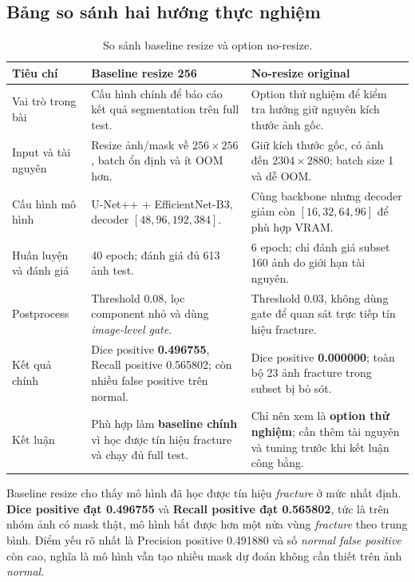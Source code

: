 \documentclass[12pt,a4paper]{article}
\newcommand{\thead}[1]{\cellcolor{tablehead}\textbf{#1}}
\newcommand{\important}[1]{\textbf{#1}}
\begin{document}
\subsection*{Bảng so sánh hai hướng thực nghiệm}
\begin{table}[H]
\centering
\caption{So sánh baseline resize và option no-resize.}
\label{tab:resize_noresize_compare}
\footnotesize
\setlength{\tabcolsep}{3pt}
\begin{tabularx}{\textwidth}{|p{2.7cm}|Y|Y|}
\hline
\thead{Tiêu chí} & \thead{Baseline resize 256} & \thead{No-resize original} \\
\hline
Vai trò trong bài & Cấu hình chính để báo cáo kết quả segmentation trên full test. & Option thử nghiệm để kiểm tra hướng giữ nguyên kích thước ảnh gốc. \\
\hline
Input và tài nguyên & Resize ảnh/mask về \(256 \times 256\), batch ổn định và ít OOM hơn. & Giữ kích thước gốc, có ảnh đến \(2304 \times 2880\); batch size 1 và dễ OOM. \\
\hline
Cấu hình mô hình & U-Net++ + EfficientNet-B3, decoder \([48,96,192,384]\). & Cùng backbone nhưng decoder giảm còn \([16,32,64,96]\) để phù hợp VRAM. \\
\hline
Huấn luyện và đánh giá & 40 epoch; đánh giá đủ 613 ảnh test. & 6 epoch; chỉ đánh giá subset 160 ảnh do giới hạn tài nguyên. \\
\hline
Postprocess & Threshold 0.08, lọc component nhỏ và dùng \textit{image-level gate}. & Threshold 0.03, không dùng gate để quan sát trực tiếp tín hiệu fracture. \\
\hline
Kết quả chính & Dice positive \important{0.496755}, Recall positive 0.565802; còn nhiều false positive trên normal. & Dice positive \important{0.000000}; toàn bộ 23 ảnh fracture trong subset bị bỏ sót. \\
\hline
Kết luận & Phù hợp làm \important{baseline chính} vì học được tín hiệu fracture và chạy đủ full test. & Chỉ nên xem là \important{option thử nghiệm}; cần thêm tài nguyên và tuning trước khi kết luận công bằng. \\
\hline
\end{tabularx}
\end{table}

Baseline resize cho thấy mô hình đã học được tín hiệu \textit{fracture} ở mức nhất định. \important{Dice positive đạt 0.496755} và \important{Recall positive đạt 0.565802}, tức là trên nhóm ảnh có mask thật, mô hình bắt được hơn một nửa vùng \textit{fracture} theo trung bình. Điểm yếu rõ nhất là Precision positive 0.491880 và số \textit{normal false positive} còn cao, nghĩa là mô hình vẫn tạo nhiều mask dự đoán không cần thiết trên ảnh \textit{normal}.
\end{document}
